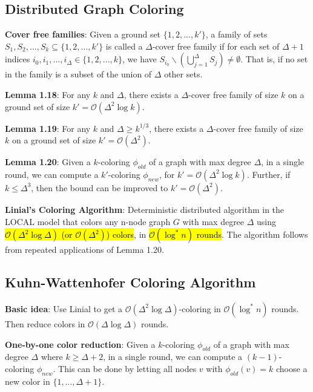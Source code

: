 \documentclass[a4paper, 8pt, landscape]{scrartcl}
\begin{document}
\begin{multicols*}{3}
\section{Distributed Graph Coloring}

\textbf{Cover free families}: Given a ground set $\{1,2,...,k'\}$, a family of sets $S_1, S_2, ..., S_k \subseteq \{1,2,...,k'\}$ is called a $\Delta$-cover free family if for each set of $\Delta + 1$ indices $i_0, i_1, ..., i_{\Delta} \in \{1,2,...,k\}$, we have $S_{i_0} \backslash (\bigcup_{j=1}^{\Delta} S_j) \neq \emptyset$. That is, if no set in the family is a subset of the union of $\Delta$ other sets.

\textbf{Lemma 1.18}: For any $k$ and $\Delta$, there exists a $\Delta$-cover free family of size $k$ on a ground set of size $k' = \mathcal{O}(\Delta^2 \log k)$.

\textbf{Lemma 1.19}: For any $k$ and $\Delta \geq k^{1/3}$, there exists a $\Delta$-cover free family of size $k$ on a ground set of size $k' = \mathcal{O}(\Delta^2)$.

\textbf{Lemma 1.20}: Given a $k$-coloring $\phi_{old}$ of a graph with max degree $\Delta$, in a single round, we can compute a $k'$-coloring $\phi_{new}$, for $k' = \mathcal{O}(\Delta^2 \log k)$. Further, if $k \leq \Delta^3$, then the bound can be improved to $k' = \mathcal{O}(\Delta^2)$.

\textbf{Linial's Coloring Algorithm}: Deterministic distributed algorithm in the LOCAL model that colors any n-node graph $G$ with max degree $\Delta$ using \hl{$\mathcal{O}(\Delta^2 \log \Delta)$ (or $\mathcal{O}(\Delta^2)$) colors}, in \hl{$\mathcal{O}(\log^* n)$ rounds}. The algorithm follows from repeated applications of Lemma 1.20. 

\subsection{Kuhn-Wattenhofer Coloring Algorithm}

\textbf{Basic idea}: Use Linial to get a $\mathcal{O}(\Delta^2 \log \Delta)$-coloring in $\mathcal{O}(\log^* n)$ rounds. Then reduce colors in $\mathcal{O}(\Delta \log \Delta)$ rounds.

\textbf{One-by-one color reduction}: Given a $k$-coloring $\phi_{old}$ of a graph with max degree $\Delta$ where $k \geq \Delta + 2$, in a single round, we can compute a $(k-1)$-coloring $\phi_{new}$. This can be done by letting all nodes $v$ with $\phi_{old}(v) = k$ choose a new color in $\{1, ..., \Delta+1\}$.


\end{multicols*}
\end{document}
